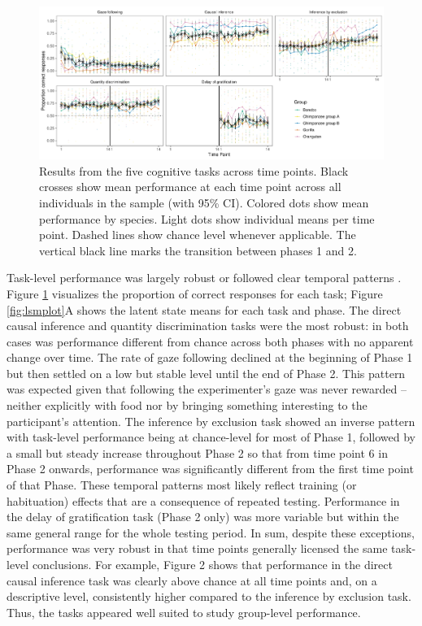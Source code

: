 \documentclass[
  man,floatsintext]{apa6}
\begin{document}
\begin{figure}
\includegraphics[width=1\linewidth]{./figures/performance} \caption{Results from the five cognitive tasks across time points. Black crosses show mean performance at each time point across all individuals in the sample (with 95\% CI). Colored dots show mean performance by species. Light dots show individual means per time point. Dashed lines show chance level whenever applicable. The vertical black line marks the transition between phases 1 and 2.}\label{fig:perfplot}
\end{figure}

Task-level performance was largely robust or followed clear temporal patterns . Figure \ref{fig:perfplot} visualizes the proportion of correct responses for each task; Figure \ref{fig:lsmplot}A shows the latent state means for each task and phase. The direct causal inference and quantity discrimination tasks were the most robust: in both cases was performance different from chance across both phases with no apparent change over time. The rate of gaze following declined at the beginning of Phase 1 but then settled on a low but stable level until the end of Phase 2. This pattern was expected given that following the experimenter's gaze was never rewarded -- neither explicitly with food nor by bringing something interesting to the participant's attention. The inference by exclusion task showed an inverse pattern with task-level performance being at chance-level for most of Phase 1, followed by a small but steady increase throughout Phase 2 so that from time point 6 in Phase 2 onwards, performance was significantly different from the first time point of that Phase. These temporal patterns most likely reflect training (or habituation) effects that are a consequence of repeated testing. Performance in the delay of gratification task (Phase 2 only) was more variable but within the same general range for the whole testing period. In sum, despite these exceptions, performance was very robust in that time points generally licensed the same task-level conclusions. For example, Figure 2 shows that performance in the direct causal inference task was clearly above chance at all time points and, on a descriptive level, consistently higher compared to the inference by exclusion task. Thus, the tasks appeared well suited to study group-level performance.
\end{document}
